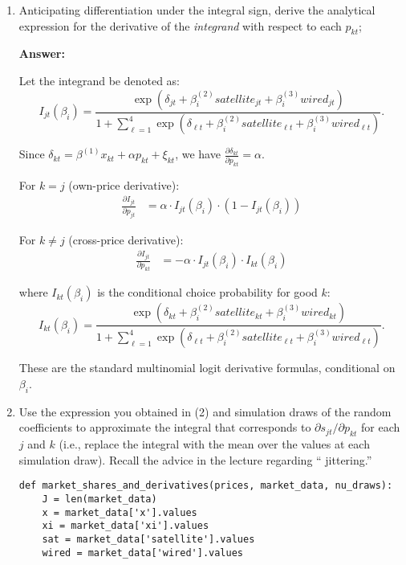 \documentclass[english,11pt]{article}
\begin{document}
\begin{enumerate}
\begin{enumerate}
\begin{enumerate}
\item Anticipating differentiation under the integral sign, derive the
analytical expression for the derivative of the \textit{integrand} with
respect to each $p_{kt}$; 

\textbf{Answer:}

Let the integrand be denoted as:
\begin{equation*}
I_{jt}(\beta_i) = \frac{\exp(\delta_{jt} + \beta_i^{(2)}satellite_{jt} + \beta_i^{(3)}wired_{jt})}{1 + \sum_{\ell=1}^4 \exp(\delta_{\ell t} + \beta_i^{(2)}satellite_{\ell t} + \beta_i^{(3)}wired_{\ell t})}.
\end{equation*}

Since $\delta_{kt} = \beta^{(1)}x_{kt} + \alpha p_{kt} + \xi_{kt}$, we have $\frac{\partial \delta_{kt}}{\partial p_{kt}} = \alpha$.

For $k = j$ (own-price derivative):
\begin{align*}
\frac{\partial I_{jt}}{\partial p_{jt}} &= \alpha \cdot I_{jt}(\beta_i) \cdot (1 - I_{jt}(\beta_i))
\end{align*}

For $k \neq j$ (cross-price derivative):
\begin{align*}
\frac{\partial I_{jt}}{\partial p_{kt}} &= -\alpha \cdot I_{jt}(\beta_i) \cdot I_{kt}(\beta_i)
\end{align*}

where $I_{kt}(\beta_i)$ is the conditional choice probability for good $k$:
\begin{equation*}
I_{kt}(\beta_i) = \frac{\exp(\delta_{kt} + \beta_i^{(2)}satellite_{kt} + \beta_i^{(3)}wired_{kt})}{1 + \sum_{\ell=1}^4 \exp(\delta_{\ell t} + \beta_i^{(2)}satellite_{\ell t} + \beta_i^{(3)}wired_{\ell t})}.
\end{equation*}

These are the standard multinomial logit derivative formulas, conditional on $\beta_i$.


\item Use the expression you obtained in (2) and simulation draws of the
random coefficients to approximate the integral that corresponds to $%
\partial s_{jt}/\partial p_{kt}$ for each $j$ and $k$ (i.e., replace
the integral with the mean over the values at each simulation draw). Recall the advice in the lecture regarding \textquotedblleft
jittering.\textquotedblright\ \newline

\begin{verbatim}
def market_shares_and_derivatives(prices, market_data, nu_draws):
    J = len(market_data)
    x = market_data['x'].values
    xi = market_data['xi'].values
    sat = market_data['satellite'].values
    wired = market_data['wired'].values
    

\end{verbatim}
\end{enumerate}
\end{enumerate}
\end{enumerate}
\end{document}
